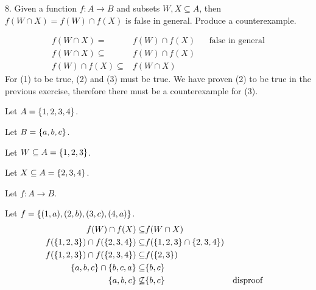 \documentclass{idrisMemo}
\begin{document}
\begin{prooflist}{8. Given a function $f: A \rightarrow B$ and subsets $W, X \subseteq A$, then $f(W \cap X)=f(W) \cap f(X)$ is false in general. Produce a counterexample.}
\item \imagedef{}
\begin{align}
    f(W \cap X)=&f(W) \cap f(X) &&\text{false in general}\\
    f(W \cap X)\subseteq& f(W) \cap f(X) \\
    f(W) \cap f(X) \subseteq& f(W \cap X)
\end{align}
For (1) to be true, (2) and (3) must be true. We have proven (2) to be true in
the previous exercise, therefore there must be a counterexample for (3).
\item Let $A=\{1, 2, 3, 4\}$.
\item Let $B=\{a, b, c\}$.
\item Let $W\subseteq A = \{1, 2, 3\}$.
\item Let $X\subseteq A = \{2, 3, 4\}$.
\item Let $f: A \rightarrow B$.
\item Let $f = \{(1, a), (2, b), (3, c), (4, a)\}$.
\begin{align}
    f(W) \cap f(X) \subseteq& f(W \cap X)\\
    f(\{1, 2, 3\}) \cap f(\{2, 3, 4\}) \subseteq& f(\{1, 2, 3\} \cap \{2, 3, 4\})\\
    f(\{1, 2, 3\}) \cap f(\{2, 3, 4\}) \subseteq& f(\{2, 3\})\\
    \{a, b, c\} \cap \{b, c, a\} \subseteq& \{b, c\}\\
    \{a, b, c\} \not\subseteq& \{b, c\}&&\text{disproof}
\end{align}
\end{prooflist}
\end{document}
